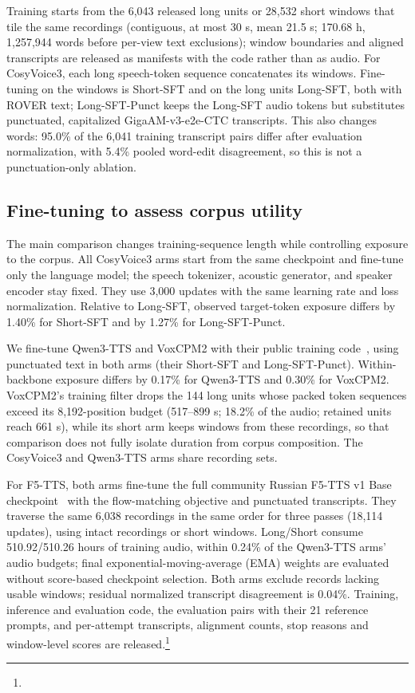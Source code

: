 \documentclass{article}
\newcommand{\model}{CosyVoice3}
\newcommand{\codestatement}{Training, inference and evaluation code, the evaluation
  pairs with their 21 reference prompts, and per-attempt transcripts, alignment
  counts, stop reasons and window-level scores are released.\footnote{\codelink}}
\begin{document}
Training starts from the 6,043 released long units or 28,532 short windows that
tile the same recordings (contiguous, at most 30 s, mean 21.5 s; 170.68 h,
1,257,944 words before per-view text exclusions); window boundaries and aligned
transcripts are released as manifests with the code rather than as audio.  For \model{},
each long speech-token sequence concatenates its windows.  Fine-tuning on the
windows is Short-SFT and on the long units Long-SFT, both with ROVER text;
Long-SFT-Punct keeps the Long-SFT audio tokens but substitutes
punctuated, capitalized GigaAM-v3-e2e-CTC transcripts.  This also changes words: 95.0\% of the 6,041 training transcript pairs differ
after evaluation normalization, with 5.4\% pooled word-edit disagreement, so this
is not a punctuation-only ablation.

\subsection{Fine-tuning to assess corpus utility}
\label{sec:sft}

The main comparison changes training-sequence length while controlling exposure to
the corpus.  All \model{} arms start from the same checkpoint and fine-tune only the
language model; the speech tokenizer, acoustic generator, and speaker encoder stay
fixed.  They use 3,000 updates with the same learning rate and loss normalization.
Relative to Long-SFT, observed target-token exposure differs by 1.40\% for Short-SFT
and by 1.27\% for Long-SFT-Punct.

We fine-tune Qwen3-TTS and VoxCPM2 with their public training
code~\cite{qwen2026qwen3ttscode,openbmb2026voxcpmcode}, using punctuated text in both
arms (their Short-SFT and Long-SFT-Punct).  Within-backbone exposure differs by
0.17\% for Qwen3-TTS and 0.30\% for VoxCPM2.  VoxCPM2's training filter drops the
144 long units whose packed token sequences exceed its 8,192-position budget
(517--899 s; 18.2\% of the audio; retained units reach 661 s), while its short arm
keeps windows from these recordings, so that comparison does not fully isolate
duration from corpus composition.  The \model{} and Qwen3-TTS arms
share recording sets.

For F5-TTS, both arms fine-tune the full community Russian F5-TTS v1 Base
checkpoint~\cite{misha2025f5ru} with the flow-matching objective and punctuated
transcripts.  They traverse the same 6,038 recordings in
the same order for three passes (18,114 updates), using intact recordings or short
windows.  Long/Short consume 510.92/510.26 hours of training audio, within 0.24\% of
the Qwen3-TTS arms' audio budgets; final exponential-moving-average (EMA) weights are evaluated without
score-based checkpoint selection.  Both arms exclude records lacking usable windows;
residual normalized transcript disagreement is 0.04\%.  \codestatement{}
\end{document}
